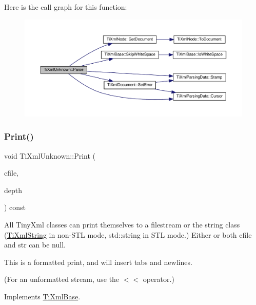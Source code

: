 Here is the call graph for this function\+:\nopagebreak
\begin{figure}[H]
\begin{center}
\leavevmode
\includegraphics[width=350pt]{class_ti_xml_unknown_aa51c2694e4177b5f0b5429ee5a81b58d_cgraph}
\end{center}
\end{figure}
\mbox{\label{class_ti_xml_unknown_a5793fbc48ab3419783c0e866ca2d334e}} 
\subsubsection{\texorpdfstring{Print()}{Print()}}
{\footnotesize\ttfamily void Ti\+Xml\+Unknown\+::\+Print (\begin{DoxyParamCaption}\item[{F\+I\+LE $\ast$}]{cfile,  }\item[{int}]{depth }\end{DoxyParamCaption}) const\hspace{0.3cm}{\ttfamily [virtual]}}

All Tiny\+Xml classes can print themselves to a filestream or the string class (\hyperlink{class_ti_xml_string}{Ti\+Xml\+String} in non-\/\+S\+TL mode, std\+::string in S\+TL mode.) Either or both cfile and str can be null.

This is a formatted print, and will insert tabs and newlines.

(For an unformatted stream, use the $<$$<$ operator.) 

Implements \hyperlink{class_ti_xml_base_a0de56b3f2ef14c65091a3b916437b512}{Ti\+Xml\+Base}.

\mbox{\label{class_ti_xml_unknown_a0d08dc16fc9ce16140ccaefbc35f6ea6}} 
